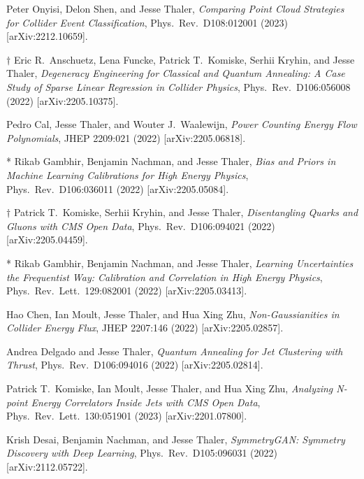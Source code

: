 \begin{list}{[]\addtocounter{jessecount}{-1}}{\leftmargin=3em \itemsep=4pt}
\item
 Peter Onyisi, Delon Shen, and Jesse Thaler,
\emph{Comparing Point Cloud Strategies for Collider Event Classification},
Phys.\ Rev.\ D108:012001 (2023)
[arXiv:2212.10659].

\item
$\dagger$ Eric R.\ Anschuetz, Lena Funcke, Patrick T.\ Komiske, Serhii Kryhin, and Jesse Thaler,
\emph{Degeneracy Engineering for Classical and Quantum Annealing: A Case Study of Sparse Linear Regression in Collider Physics},
Phys.\ Rev.\ D106:056008 (2022)
[arXiv:2205.10375].

\item
 Pedro Cal, Jesse Thaler, and Wouter J.\ Waalewijn,
\emph{Power Counting Energy Flow Polynomials},
JHEP 2209:021 (2022)
[arXiv:2205.06818].

\item
* Rikab Gambhir, Benjamin Nachman, and Jesse Thaler,
\emph{Bias and Priors in Machine Learning Calibrations for High Energy Physics},
Phys.\ Rev.\ D106:036011 (2022)
[arXiv:2205.05084].

\item
$\dagger$ Patrick T.\ Komiske, Serhii Kryhin, and Jesse Thaler,
\emph{Disentangling Quarks and Gluons with CMS Open Data},
Phys.\ Rev.\ D106:094021 (2022)
[arXiv:2205.04459].

\item
* Rikab Gambhir, Benjamin Nachman, and Jesse Thaler,
\emph{Learning Uncertainties the Frequentist Way: Calibration and Correlation in High Energy Physics},
Phys.\ Rev.\ Lett.\ 129:082001 (2022)
[arXiv:2205.03413].

\item
 Hao Chen, Ian Moult, Jesse Thaler, and Hua Xing Zhu,
\emph{Non-Gaussianities in Collider Energy Flux},
JHEP 2207:146 (2022)
[arXiv:2205.02857].

\item
 Andrea Delgado and Jesse Thaler,
\emph{Quantum Annealing for Jet Clustering with Thrust},
Phys.\ Rev.\ D106:094016 (2022)
[arXiv:2205.02814].

\item
 Patrick T.\ Komiske, Ian Moult, Jesse Thaler, and Hua Xing Zhu,
\emph{Analyzing N-point Energy Correlators Inside Jets with CMS Open Data},
Phys.\ Rev.\ Lett.\ 130:051901 (2023)
[arXiv:2201.07800].

\item
 Krish Desai, Benjamin Nachman, and Jesse Thaler,
\emph{SymmetryGAN: Symmetry Discovery with Deep Learning},
Phys.\ Rev.\ D105:096031 (2022)
[arXiv:2112.05722].


\end{list}
